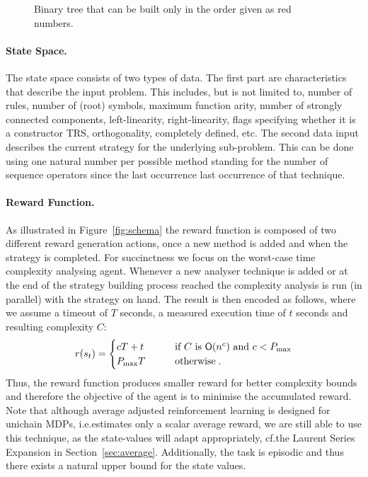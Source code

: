 \documentclass[envcountsame]{llncs}
\begin{document}
\begin{figure*}[t!]
  \centering
  \caption{\label{fig:binary}Binary tree that can be built only in the order given as red numbers.}
\end{figure*}

\paragraph{State Space.} The state space consists of two types of data. The first part are
characteristics that describe the input problem. This includes, but is not limited to, number of
rules, number of (root) symbols, maximum function arity, number of strongly connected components,
left-linearity, right-linearity, flags specifying whether it is a constructor TRS, orthogonality,
completely defined, etc. The second data input describes the current strategy for the underlying
sub-problem. This can be done using one natural number per possible method standing for the number
of sequence operators since the last occurrence last occurrence of that technique.

\paragraph{Reward Function.} As illustrated in Figure~\ref{fig:schema} the reward function is
composed of two different reward generation actions, once a new method is added and when the
strategy is completed. %
For succinctness we focus on the worst-case time complexity analysing agent. Whenever a new analyser
technique is added or at the end of the strategy building process reached the complexity analysis is
run (in parallel) with the strategy on hand. The result is then encoded as follows, where we assume
a timeout of \(T\) seconds, a measured execution time of \(t\) seconds and resulting complexity \(C\):
\begin{align*}
  r(s_{t}) =
  \begin{cases}
     c T + t    & \qquad   \text{if $C$ is }\bO(n^{c}) \text{ and } c < P_{\max}\\
     P_{\max} T  & \qquad  \text{otherwise}\tpkt
  \end{cases}
\end{align*}
Thus, the reward function produces smaller reward for better complexity bounds and therefore the
objective of the agent is to minimise the accumulated reward. Note that although average adjusted
reinforcement learning is designed for unichain MDPs, i.e.\@ estimates only a scalar average reward,
we are still able to use this technique, as the state-values will adapt appropriately, cf.\@ the
Laurent Series Expansion in Section~\ref{sec:average}. Additionally, the task is episodic and thus
there exists a natural upper bound for the state values.
\end{document}

